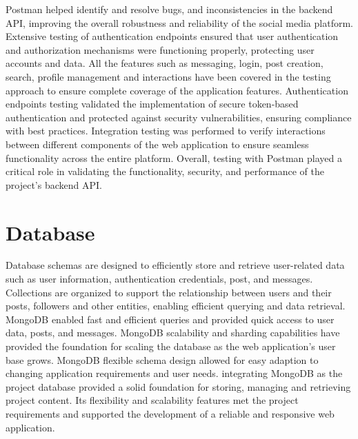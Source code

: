 Postman helped identify and resolve bugs, and inconsistencies in the backend API, improving the overall robustness and reliability of the social media platform. Extensive testing of authentication endpoints ensured that user authentication and authorization mechanisms were functioning properly, protecting user accounts and data. All the features such as messaging, login, post creation, search, profile management and interactions have been covered in the testing approach to ensure complete coverage of the application features. Authentication endpoints testing validated the implementation of secure token-based authentication and protected against security vulnerabilities, ensuring compliance with best practices. Integration testing was performed to verify interactions between different components of the web application to ensure seamless functionality across the entire platform. Overall, testing with Postman played a critical role in validating the functionality, security, and performance of the project's backend API.

\section{Database}
Database schemas are designed to efficiently store and retrieve user-related data such as user information, authentication credentials, post, and messages. Collections are organized to support the relationship between users and their posts, followers and other entities, enabling efficient querying and data retrieval. MongoDB enabled fast and efficient queries and provided quick access to user data, posts, and messages. MongoDB scalability and sharding capabilities have provided the foundation for scaling the database as the web application's user base grows. MongoDB flexible schema design allowed for easy adaption to changing application requirements and user needs. integrating MongoDB as the project database provided a solid foundation for storing, managing and retrieving project content. Its flexibility and scalability features met the project requirements and supported the development of a reliable and responsive web application.

